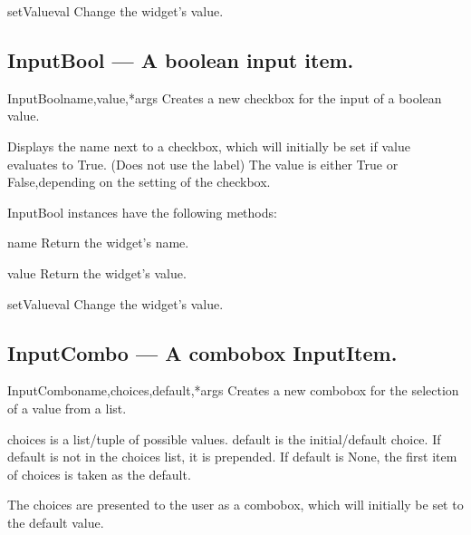\begin{funcdesc}{setValue}{val}
Change the widget's value.
\end{funcdesc}

\subsection{InputBool --- A boolean input item.}


\begin{classdesc}{InputBool}{name,value,*args}
Creates a new checkbox for the input of a boolean value.
        
        Displays the name next to a checkbox, which will initially be set
        if value evaluates to True. (Does not use the label)
        The value is either True or False,depending on the setting
        of the checkbox.
        
\end{classdesc}

InputBool instances have the following methods:

\begin{funcdesc}{name}{}
Return the widget's name.
\end{funcdesc}

\begin{funcdesc}{value}{}
Return the widget's value.
\end{funcdesc}

\begin{funcdesc}{setValue}{val}
Change the widget's value.
\end{funcdesc}

\subsection{InputCombo --- A combobox InputItem.}


\begin{classdesc}{InputCombo}{name,choices,default,*args}
Creates a new combobox for the selection of a value from a list.

        choices is a list/tuple of possible values.
        default is the initial/default choice.
        If default is not in the choices list, it is prepended.
        If default is None, the first item of choices is taken as the default.
       
        The choices are presented to the user as a combobox, which will
        initially be set to the default value.
        
\end{classdesc}

